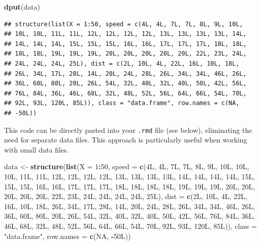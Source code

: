 \documentclass[
  12pt,
]{article}
\newenvironment{Shaded}{\begin{snugshade}}{\end{snugshade}}
\newcommand{\AttributeTok}[1]{\textcolor[rgb]{0.13,0.29,0.53}{#1}}
\newcommand{\ConstantTok}[1]{\textcolor[rgb]{0.56,0.35,0.01}{#1}}
\newcommand{\DecValTok}[1]{\textcolor[rgb]{0.00,0.00,0.81}{#1}}
\newcommand{\FunctionTok}[1]{\textcolor[rgb]{0.13,0.29,0.53}{\textbf{#1}}}
\newcommand{\NormalTok}[1]{#1}
\newcommand{\OtherTok}[1]{\textcolor[rgb]{0.56,0.35,0.01}{#1}}
\newcommand{\SpecialCharTok}[1]{\textcolor[rgb]{0.81,0.36,0.00}{\textbf{#1}}}
\newcommand{\StringTok}[1]{\textcolor[rgb]{0.31,0.60,0.02}{#1}}
\begin{document}
\begin{Shaded}
\begin{Highlighting}[]
\FunctionTok{dput}\NormalTok{(data)}
\end{Highlighting}
\end{Shaded}

\begin{verbatim}
## structure(list(X = 1:50, speed = c(4L, 4L, 7L, 7L, 8L, 9L, 10L, 
## 10L, 10L, 11L, 11L, 12L, 12L, 12L, 12L, 13L, 13L, 13L, 13L, 14L, 
## 14L, 14L, 14L, 15L, 15L, 15L, 16L, 16L, 17L, 17L, 17L, 18L, 18L, 
## 18L, 18L, 19L, 19L, 19L, 20L, 20L, 20L, 20L, 20L, 22L, 23L, 24L, 
## 24L, 24L, 24L, 25L), dist = c(2L, 10L, 4L, 22L, 16L, 10L, 18L, 
## 26L, 34L, 17L, 28L, 14L, 20L, 24L, 28L, 26L, 34L, 34L, 46L, 26L, 
## 36L, 60L, 80L, 20L, 26L, 54L, 32L, 40L, 32L, 40L, 50L, 42L, 56L, 
## 76L, 84L, 36L, 46L, 68L, 32L, 48L, 52L, 56L, 64L, 66L, 54L, 70L, 
## 92L, 93L, 120L, 85L)), class = "data.frame", row.names = c(NA, 
## -50L))
\end{verbatim}

This code can be directly pasted into your \texttt{.rmd} file (see below), eliminating the need for separate data files. This approach is particularly useful when working with small data files.

\begin{Shaded}
\begin{Highlighting}[]
\NormalTok{data }\OtherTok{\textless{}{-}} \FunctionTok{structure}\NormalTok{(}\FunctionTok{list}\NormalTok{(}\AttributeTok{X =} \DecValTok{1}\SpecialCharTok{:}\DecValTok{50}\NormalTok{, }\AttributeTok{speed =} \FunctionTok{c}\NormalTok{(4L, 4L, 7L, 7L, 8L, 9L, 10L, }
\NormalTok{10L, 10L, 11L, 11L, 12L, 12L, 12L, 12L, 13L, 13L, 13L, 13L, 14L, }
\NormalTok{14L, 14L, 14L, 15L, 15L, 15L, 16L, 16L, 17L, 17L, 17L, 18L, 18L, }
\NormalTok{18L, 18L, 19L, 19L, 19L, 20L, 20L, 20L, 20L, 20L, 22L, 23L, 24L, }
\NormalTok{24L, 24L, 24L, 25L), }\AttributeTok{dist =} \FunctionTok{c}\NormalTok{(2L, 10L, 4L, 22L, 16L, 10L, 18L, }
\NormalTok{26L, 34L, 17L, 28L, 14L, 20L, 24L, 28L, 26L, 34L, 34L, 46L, 26L, }
\NormalTok{36L, 60L, 80L, 20L, 26L, 54L, 32L, 40L, 32L, 40L, 50L, 42L, 56L, }
\NormalTok{76L, 84L, 36L, 46L, 68L, 32L, 48L, 52L, 56L, 64L, 66L, 54L, 70L, }
\NormalTok{92L, 93L, 120L, 85L)), }
\AttributeTok{class =} \StringTok{"data.frame"}\NormalTok{, }\AttributeTok{row.names =} \FunctionTok{c}\NormalTok{(}\ConstantTok{NA}\NormalTok{, }
\SpecialCharTok{{-}}\NormalTok{50L))}
\end{Highlighting}
\end{Shaded}
\end{document}
